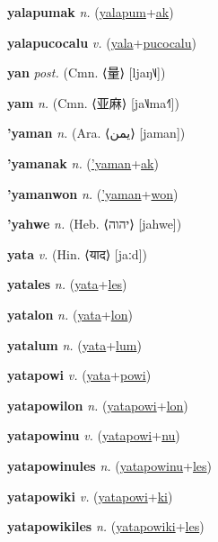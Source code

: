 \textbf{\hypertarget{yalapumak}{yalapumak}} \textit{n.} (\hyperlink{yalapum}{yalapum}+\allowbreak \hyperlink{ak}{ak})


\textbf{\hypertarget{yalapucocalu}{yalapucocalu}} \textit{v.} (\hyperlink{yala}{yala}+\allowbreak \hyperlink{pucocalu}{pucocalu})


\textbf{\hypertarget{yan}{yan}} \textit{post.} (Cmn. ⟨{\chinese{}量}⟩ [ljaŋ˥˩])


\textbf{\hypertarget{yam}{yam}} \textit{n.} (Cmn. ⟨{\chinese{}亚麻}⟩ [ja˥˩ma˧˥])


\textbf{\hypertarget{'yaman}{'yaman}} \textit{n.} (Ara. ⟨{\arabics{}يمن}⟩ [jaman])


\textbf{\hypertarget{'yamanak}{'yamanak}} \textit{n.} (\hyperlink{'yaman}{'yaman}+\allowbreak \hyperlink{ak}{ak})


\textbf{\hypertarget{'yamanwon}{'yamanwon}} \textit{n.} (\hyperlink{'yaman}{'yaman}+\allowbreak \hyperlink{won}{won})


\textbf{\hypertarget{'yahwe}{'yahwe}} \textit{n.} (Heb. ⟨{\hebrew{}יהוה‬}⟩ [jahwe])


\textbf{\hypertarget{yata}{yata}} \textit{v.} (Hin. ⟨{\devanagari{}याद}⟩ [jaːd])


\textbf{\hypertarget{yatales}{yatales}} \textit{n.} (\hyperlink{yata}{yata}+\allowbreak \hyperlink{les}{les})


\textbf{\hypertarget{yatalon}{yatalon}} \textit{n.} (\hyperlink{yata}{yata}+\allowbreak \hyperlink{lon}{lon})


\textbf{\hypertarget{yatalum}{yatalum}} \textit{n.} (\hyperlink{yata}{yata}+\allowbreak \hyperlink{lum}{lum})


\textbf{\hypertarget{yatapowi}{yatapowi}} \textit{v.} (\hyperlink{yata}{yata}+\allowbreak \hyperlink{powi}{powi})


\textbf{\hypertarget{yatapowilon}{yatapowilon}} \textit{n.} (\hyperlink{yatapowi}{yatapowi}+\allowbreak \hyperlink{lon}{lon})


\textbf{\hypertarget{yatapowinu}{yatapowinu}} \textit{v.} (\hyperlink{yatapowi}{yatapowi}+\allowbreak \hyperlink{nu}{nu})


\textbf{\hypertarget{yatapowinules}{yatapowinules}} \textit{n.} (\hyperlink{yatapowinu}{yatapowinu}+\allowbreak \hyperlink{les}{les})


\textbf{\hypertarget{yatapowiki}{yatapowiki}} \textit{v.} (\hyperlink{yatapowi}{yatapowi}+\allowbreak \hyperlink{ki}{ki})


\textbf{\hypertarget{yatapowikiles}{yatapowikiles}} \textit{n.} (\hyperlink{yatapowiki}{yatapowiki}+\allowbreak \hyperlink{les}{les})


